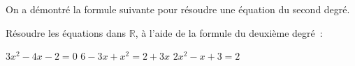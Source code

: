 \documentclass[a4paper,12pt]{report}
\begin{document}
On a démontré la formule suivante pour résoudre une équation du second degré.

\begin{boiteExT}
	\vspace{16cm}
\end{boiteExT}
\begin{boiteExT}[$2x^2-x+3=0$]
	\vspace{5cm}
\end{boiteExT}
\begin{boiteExT}[$2x^2-x-6=0$]
	\vspace{5cm}
\end{boiteExT}
\begin{boiteExT}[$2x^2-x+3=3x^2+x+2$]
	\vspace{7cm}
\end{boiteExT}

Résoudre les équations dans $\mathbb{R}$, à l'aide de la formule du deuxième degré~:
\begin{tasks}
\task $3 x^2-4 x-2=0$
\task $6-3 x+x^2=2+3x$
\task $2 x^2-x+3=2$
\end{tasks}
\end{document}
